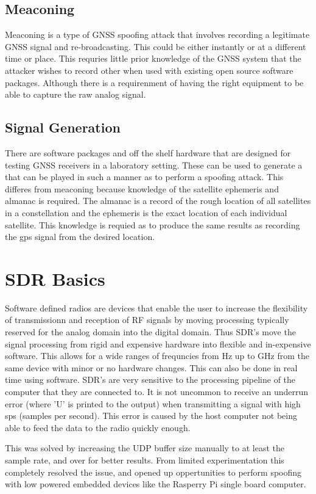 \subsection{Meaconing}
Meaconing is a type of GNSS spoofing attack that involves recording a legitimate GNSS signal and re-broadcasting. This could be either instantly or at a different time or
place. This requries little prior knowledge of the GNSS system that the attacker wishes to record other when used with existing open source software packages. Although
there is a requirenment of having the right equipment to be able to capture the raw analog signal.

\subsection{Signal Generation}
There are software packages and off the shelf hardware that are designed for testing GNSS receivers in a laboratory setting. These can be used to generate a that can be
played in such a manner as to perform a spoofing attack. This differes from meaconing because knowledge of the satellite ephemeris and almanac is required. The almanac is
a record of the rough location of all satellites in a constellation and the ephemeris is the exact location of each individual satellite. This knowledge is requied as to
produce the same results as recording the gps signal from the desired location.


\section{SDR Basics}
Software defined radios are devices that enable the user to increase the flexibility of transmissionn and reception of RF signals by moving processing typically reserved
for the analog domain into the digital domain. Thus SDR's move the signal processing from rigid and expensive hardware into flexible and in-expensive software. This
allows for a wide ranges of frequncies from Hz up to GHz from the same device with minor or no hardware changes. This can also be done in real time using software.
SDR's are very sensitive to the processing pipeline of the computer that they are connected to. It is not uncommon to receive an underrun error (where 'U' is printed to the
output) when transmitting a signal with high sps (samples per second). This error is caused by the host computer not being able to feed the data to the radio quickly
enough.

This was solved by increasing the UDP buffer size manually to at least the sample rate, and over for better results. From limited experimentation this completely resolved the issue, and opened up
oppertunities to perform spoofing with low powered embedded devices like the Rasperry Pi single board computer. 